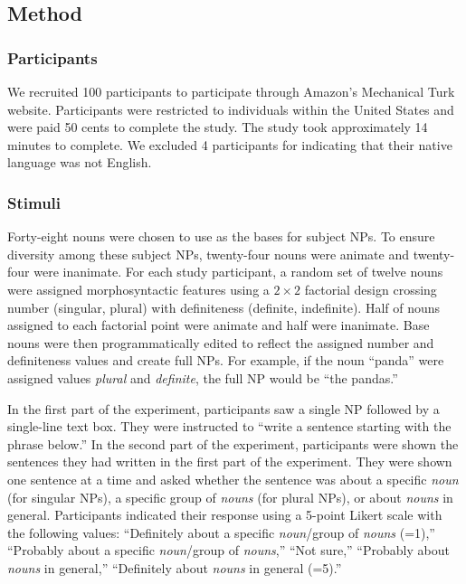 \documentclass[10pt,letterpaper]{article}
\begin{document}
\subsection{Method}

\subsubsection{Participants} 

We recruited 100 participants to participate through Amazon's Mechanical Turk website. Participants were restricted to individuals within the United States and were paid 50 cents to complete the study. The study took approximately 14 minutes to complete. We excluded 4 participants for indicating that their native language was not English.

\subsubsection{Stimuli}  

Forty-eight nouns were chosen to use as the bases for subject NPs. To ensure diversity among these subject NPs, twenty-four nouns were animate and twenty-four were inanimate. For each study participant, a random set of twelve nouns were assigned morphosyntactic features using a \(2 \times 2\) factorial design crossing number (singular, plural) with definiteness (definite, indefinite). Half of nouns assigned to each factorial point were animate and half were inanimate. Base nouns were then programmatically edited to reflect the assigned number and definiteness values and create full NPs. For example, if the noun ``panda'' were assigned values \textit{plural} and \textit{definite}, the full NP would be ``the pandas.''

In the first part of the experiment, participants saw a single NP followed by a single-line text box. They were instructed to ``write a sentence starting with the phrase below.'' In the second part of the experiment, participants were shown the sentences they had written in the first part of the experiment. They were shown one sentence at a time and asked whether the sentence was about a specific \textit{noun} (for singular NPs), a specific group of \textit{nouns} (for plural NPs), or about \textit{nouns} in general. Participants indicated their response using a 5-point Likert scale with the following values: ``Definitely about a specific \textit{noun}/group of \textit{nouns} (=1),'' ``Probably about a specific \textit{noun}/group of \textit{nouns},'' ``Not sure,'' ``Probably about \textit{nouns} in general,'' ``Definitely about \textit{nouns} in general (=5).''
\end{document}

